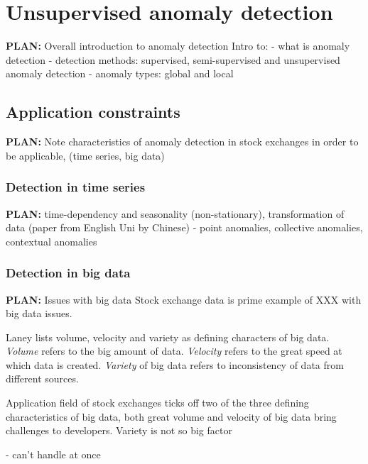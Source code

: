 \documentclass{tut-thesis}
\begin{document}


\chapter{Unsupervised anomaly detection}
\textbf{PLAN:} Overall introduction to anomaly detection
Intro to:
- what is anomaly detection
- detection methods: supervised, semi-supervised and unsupervised anomaly detection
- anomaly types: global and local

\section{Application constraints}
\textbf{PLAN:} Note characteristics of anomaly detection in stock exchanges in order to be applicable, (time series, big data)

\subsection{Detection in time series}
\textbf{PLAN:} time-dependency and seasonality (non-stationary), transformation of data (paper from English Uni by Chinese)
- point anomalies, collective anomalies, contextual anomalies

\subsection{Detection in big data}
\textbf{PLAN:} Issues with big data
Stock exchange data is prime example of XXX with big data issues.

Laney \autocite*{Laney2001} lists volume, velocity and variety as defining characters of big data. 
\textit{Volume} refers to the big amount of data.
\textit{Velocity} refers to the great speed at which data is created.
\textit{Variety} of big data refers to inconsistency of data from different sources. 

Application field of stock exchanges ticks off two of the three defining characteristics of big data, both great volume and velocity of big data bring challenges to developers. Variety is not so big factor

- can't handle at once
\end{document}

